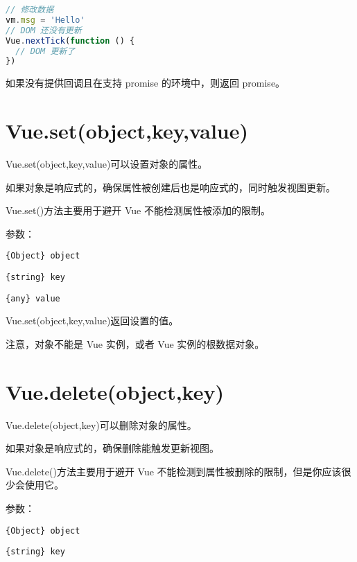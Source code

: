 \begin{lstlisting}[language=JavaScript]
// 修改数据
vm.msg = 'Hello'
// DOM 还没有更新
Vue.nextTick(function () {
  // DOM 更新了
})
\end{lstlisting}

如果没有提供回调且在支持 promise 的环境中，则返回 promise。

\section{Vue.set(object,key,value)}

Vue.set(object,key,value)可以设置对象的属性。

\begin{compactitem}
\item 如果对象是响应式的，确保属性被创建后也是响应式的，同时触发视图更新。
\item Vue.set()方法主要用于避开 Vue 不能检测属性被添加的限制。
\end{compactitem}

参数：

\begin{compactitem}
\item \texttt{\{Object\} object}
\item \texttt{\{string\} key}
\item \texttt{\{any\} value}
\end{compactitem}

Vue.set(object,key,value)返回设置的值。

注意，对象不能是 Vue 实例，或者 Vue 实例的根数据对象。

\section{Vue.delete(object,key)}


Vue.delete(object,key)可以删除对象的属性。

\begin{compactitem}
\item 如果对象是响应式的，确保删除能触发更新视图。
\item Vue.delete()方法主要用于避开 Vue 不能检测到属性被删除的限制，但是你应该很少会使用它。
\end{compactitem}


参数：

\begin{compactitem}
\item \texttt{\{Object\} object}
\item \texttt{\{string\} key}
\end{compactitem}

